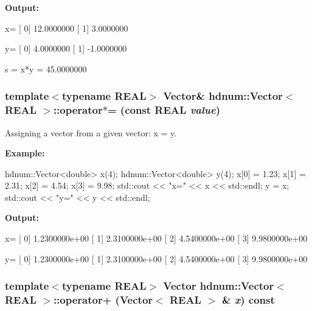 {\bfseries Output:} \begin{DoxyVerb}
x=
[ 0]     12.0000000
[ 1]      3.0000000

y=
[ 0]      4.0000000
[ 1]     -1.0000000

s = x*y = 45.0000000
	  \end{DoxyVerb}
 \hypertarget{classhdnum_1_1Vector_af410c46d0f56d02d15ff53aecb1b5701}{
\subsubsection[{operator$\ast$=}]{\setlength{\rightskip}{0pt plus 5cm}template$<$typename REAL$>$ {\bf Vector}\& {\bf hdnum::Vector}$<$ REAL $>$::operator$\ast$= (const REAL {\em value})}}
\label{classhdnum_1_1Vector_af410c46d0f56d02d15ff53aecb1b5701}


Assigning a vector from a given vector: x = y. 

{\bfseries Example:} 
\begin{DoxyCode}
hdnum::Vector<double> x(4);
hdnum::Vector<double> y(4);
x[0] = 1.23;
x[1] = 2.31;
x[2] = 4.54;
x[3] = 9.98;
std::cout << "x=" << x << std::endl;
y = x;
std::cout << "y=" << y << std::endl;
\end{DoxyCode}


{\bfseries Output:} \begin{DoxyVerb}
x=
[ 0]  1.2300000e+00
[ 1]  2.3100000e+00
[ 2]  4.5400000e+00
[ 3]  9.9800000e+00

y=
[ 0]  1.2300000e+00
[ 1]  2.3100000e+00
[ 2]  4.5400000e+00
[ 3]  9.9800000e+00
	  \end{DoxyVerb}
 \hypertarget{classhdnum_1_1Vector_a15b3fcda96f788a4de617d24f6974647}{
\subsubsection[{operator+}]{\setlength{\rightskip}{0pt plus 5cm}template$<$typename REAL$>$ {\bf Vector} {\bf hdnum::Vector}$<$ REAL $>$::operator+ ({\bf Vector}$<$ REAL $>$ \& {\em x}) const}}
\label{classhdnum_1_1Vector_a15b3fcda96f788a4de617d24f6974647}


